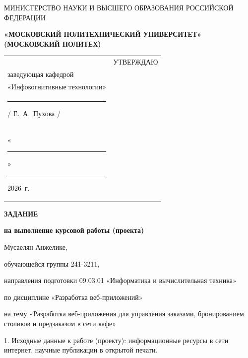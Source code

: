 \documentclass[14pt, a4paper]{extarticle}
\begin{document}
\pagestyle{empty}


\begin{center}
    {\small МИНИСТЕРСТВО НАУКИ И ВЫСШЕГО ОБРАЗОВАНИЯ РОССИЙСКОЙ ФЕДЕРАЦИИ}


    {\small \textbf{«МОСКОВСКИЙ ПОЛИТЕХНИЧЕСКИЙ УНИВЕРСИТЕТ»}} \\
    {\small \textbf{(МОСКОВСКИЙ ПОЛИТЕХ)}}
\end{center}

\begin{tabularx}{\textwidth}{@{} p{} p{} @{}}
     &
    \raggedright
    УТВЕРЖДАЮ                          \\
    заведующая кафедрой                \\
    «Инфокогнитивные технологии»       \\[0.3cm]

    \rule{3cm}{0.4pt} / Е.~А.~Пухова / \\[0.1cm]

    «\rule{0.8cm}{0.4pt}» \rule{3cm}{0.4pt} 2026~г.
\end{tabularx}


\begin{center}

    { \large \textbf{ЗАДАНИЕ}}

    \textbf{на выполнение курсовой работы (проекта)}

    Мусаелян Анжелике, %

\end{center}

обучающейся группы 241-3211,

направления подготовки 09.03.01 «Информатика и вычислительная техника»

по дисциплине «Разработка веб-приложений»

на тему «Разработка веб-приложения для управления заказами, бронированием столиков и предзаказом в сети кафе»

1. Исходные данные к работе (проекту): информационные ресурсы в сети
интернет, научные публикации в открытой печати.
\end{document}
